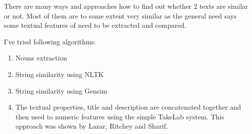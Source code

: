 There are many ways and approaches how to find out whether 2 texts are similar or not. Most of them are to some extent very similar as the general need says some textual features of need to be extracted and compared.

I've tried following algorithms:
\begin{enumerate}
\item Nouns extraction
\item String similarity using NLTK
\item String similarity using Gensim
\item The textual properties, title and description
are concatenated together and then used to numeric features using the simple TakeLab system. This approach was shown by Lazar, Ritchey and Sharif. \cite{lazar2014improving}
\end{enumerate}
